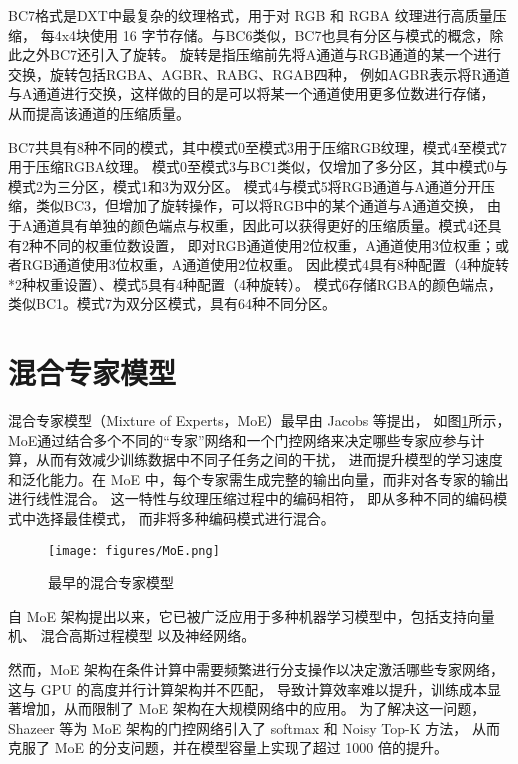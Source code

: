 BC7格式是DXT中最复杂的纹理格式，用于对 RGB 和 RGBA 纹理进行高质量压缩，
每4x4块使用 16 字节存储。与BC6类似，BC7也具有分区与模式的概念，除此之外BC7还引入了旋转。
旋转是指压缩前先将A通道与RGB通道的某一个进行交换，旋转包括RGBA、AGBR、RABG、RGAB四种，
例如AGBR表示将R通道与A通道进行交换，这样做的目的是可以将某一个通道使用更多位数进行存储，
从而提高该通道的压缩质量。

BC7共具有8种不同的模式，其中模式0至模式3用于压缩RGB纹理，模式4至模式7用于压缩RGBA纹理。
模式0至模式3与BC1类似，仅增加了多分区，其中模式0与模式2为三分区，模式1和3为双分区。
模式4与模式5将RGB通道与A通道分开压缩，类似BC3，但增加了旋转操作，可以将RGB中的某个通道与A通道交换，
由于A通道具有单独的颜色端点与权重，因此可以获得更好的压缩质量。模式4还具有2种不同的权重位数设置，
即对RGB通道使用2位权重，A通道使用3位权重；或者RGB通道使用3位权重，A通道使用2位权重。
因此模式4具有8种配置（4种旋转*2种权重设置）、模式5具有4种配置（4种旋转）。
模式6存储RGBA的颜色端点，类似BC1。模式7为双分区模式，具有64种不同分区。

\section{混合专家模型}

混合专家模型（Mixture of Experts，MoE）最早由 Jacobs 等\cite{jacobs1991adaptive}提出，
如图\ref{fig:MoE}所示，MoE通过结合多个不同的“专家”网络和一个门控网络来决定哪些专家应参与计算，从而有效减少训练数据中不同子任务之间的干扰，
进而提升模型的学习速度和泛化能力。在 MoE 中，每个专家需生成完整的输出向量，而非对各专家的输出进行线性混合。
这一特性与纹理压缩过程中的编码相符，
即从多种不同的编码模式中选择最佳模式，
而非将多种编码模式进行混合。

\begin{figure}[htbp]
    \centering
    \texttt{[image: figures/MoE.png]}
    \caption{最早的混合专家模型\cite{jacobs1991adaptive}}
    \label{fig:MoE}
\end{figure}

自 MoE 架构提出以来，它已被广泛应用于多种机器学习模型中，包括支持向量机\cite{collobert2001parallel}、
混合高斯过程模型\cite{tresp2000mixtures,rasmussen2001infinite}
以及神经网络\cite{aljundi2017expert,garmash2016ensemble,eigen2013learning}。

然而，MoE 架构在条件计算中需要频繁进行分支操作以决定激活哪些专家网络，这与 GPU 的高度并行计算架构并不匹配，
导致计算效率难以提升，训练成本显著增加，从而限制了 MoE 架构在大规模网络中的应用。
为了解决这一问题，Shazeer 等\cite{shazeer2017outrageously}为 MoE 架构的门控网络引入了 softmax 和 Noisy Top-K 方法，
从而克服了 MoE 的分支问题，并在模型容量上实现了超过 1000 倍的提升。

